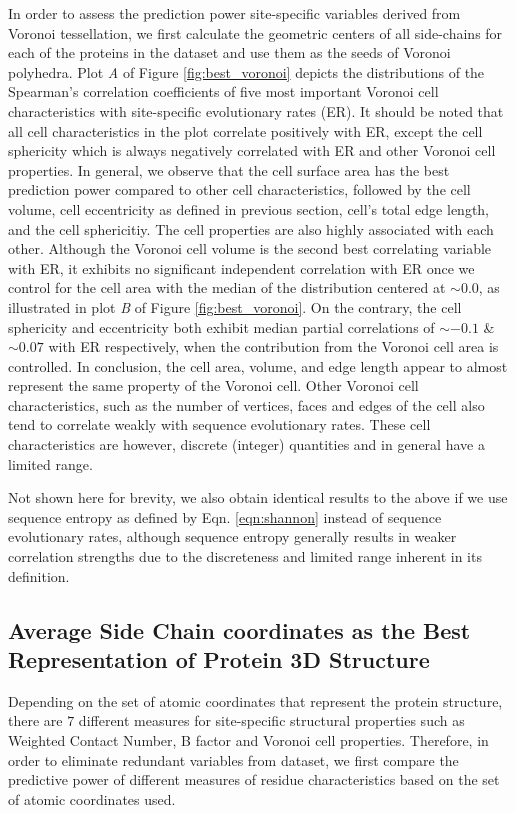 \documentclass[11pt]{article}
\begin{document}
    In order to assess the prediction power site-specific variables derived from Voronoi tessellation, we first calculate the geometric centers of all side-chains for each of the proteins in the dataset and use them as the seeds of Voronoi polyhedra. Plot {\it A} of Figure \ref{fig:best_voronoi} depicts the distributions of the Spearman's correlation coefficients of five most important Voronoi cell characteristics with site-specific evolutionary rates (ER). It should be noted that all cell characteristics in the plot correlate positively with ER, except the cell sphericity which is always negatively correlated with ER and other Voronoi cell properties. In general, we observe that the cell surface area has the best prediction power compared to other cell characteristics, followed by the cell volume, cell eccentricity as defined in previous section, cell's total edge length, and the cell sphericitiy. The cell properties are also highly associated with each other. Although the Voronoi cell volume is the second best correlating variable with ER, it exhibits no significant independent correlation with ER once we control for the cell area with the median of the distribution centered at $\sim0.0$, as illustrated in plot {\it B} of Figure \ref{fig:best_voronoi}. On the contrary, the cell sphericity and eccentricity both exhibit median partial correlations of $\sim-0.1$ \& $\sim0.07$ with ER respectively, when the contribution from the Voronoi cell area is controlled. In conclusion, the cell area, volume, and edge length appear to almost represent the same property of the Voronoi cell. Other Voronoi cell characteristics, such as the number of vertices, faces and edges of the cell also tend to correlate weakly with sequence evolutionary rates. These cell characteristics are however, discrete (integer) quantities and in general have a limited range.

    Not shown here for brevity, we also obtain identical results to the above if we use sequence entropy as defined by Eqn. \ref{eqn:shannon} instead of sequence evolutionary rates, although sequence entropy generally results in weaker correlation strengths due to the discreteness and limited range inherent in its definition.

    \subsection*{Average Side Chain coordinates as the Best Representation of Protein 3D Structure}

        Depending on the set of atomic coordinates that represent the protein structure, there are $7$ different measures for site-specific structural properties such as Weighted Contact Number, B factor and Voronoi cell properties. Therefore, in order to eliminate redundant variables from dataset, we first compare the predictive power of different measures of residue characteristics based on the set of atomic coordinates used.
        \\
\end{document}
